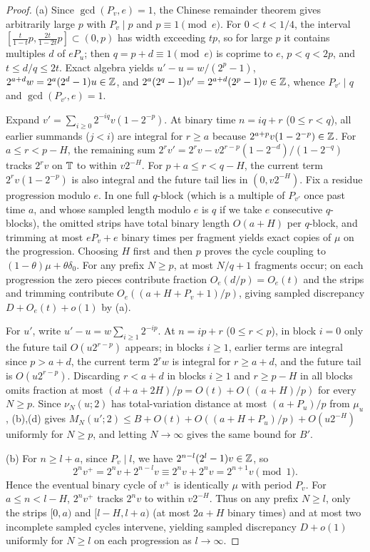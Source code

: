 \documentclass[11pt]{article}
\begin{document}
\begin{proof}
(a) Since $\gcd(P_v,e)=1$, the Chinese remainder theorem gives arbitrarily large $p$ with $P_v\mid p$ and $p\equiv1\pmod e$. For $0<t<1/4$, the interval $[\frac{t}{1-t}p,\frac{2t}{1-2t}p]\subset(0,p)$ has width exceeding $tp$, so for large $p$ it contains multiples $d$ of $eP_u$; then $q=p+d\equiv1\pmod e$ is coprime to $e$, $p<q<2p$, and $t\le d/q\le 2t$. Exact algebra yields $u'-u=w/(2^p-1)$, $2^{a+d}w=2^a(2^d-1)u\in\mathbb Z$, and $2^a(2^q-1)v'=2^{a+d}(2^p-1)v\in\mathbb Z$, whence $P_{v'}\mid q$ and $\gcd(P_{v'},e)=1$.

Expand $v'=\sum_{i\ge0}2^{-iq}v(1-2^{-p})$. At binary time $n=iq+r$ ($0\le r<q$), all earlier summands ($j<i$) are integral for $r\ge a$ because $2^{a+p}v(1-2^{-p})\in\mathbb Z$. For $a\le r<p-H$, the remaining sum $2^rv'=2^rv-v2^{r-p}(1-2^{-d})/(1-2^{-q})$ tracks $2^rv$ on $\mathbb T$ to within $v2^{-H}$. For $p+a\le r<q-H$, the current term $2^rv(1-2^{-p})$ is also integral and the future tail lies in $(0,v2^{-H})$. Fix a residue progression modulo $e$. In one full $q$-block (which is a multiple of $P_{v'}$ once past time $a$, and whose sampled length modulo $e$ is $q$ if we take $e$ consecutive $q$-blocks), the omitted strips have total binary length $O(a+H)$ per $q$-block, and trimming at most $eP_v+e$ binary times per fragment yields exact copies of $\mu$ on the progression. Choosing $H$ first and then $p$ proves the cycle coupling to $(1-\theta)\mu+\theta\delta_0$. For any prefix $N\ge p$, at most $N/q+1$ fragments occur; on each progression the zero pieces contribute fraction $O_e(d/p)=O_e(t)$ and the strips and trimming contribute $O_e((a+H+P_v+1)/p)$, giving sampled discrepancy $D+O_e(t)+o(1)$ by (a).

For $u'$, write $u'-u=w\sum_{i\ge1}2^{-ip}$. At $n=ip+r$ ($0\le r<p$), in block $i=0$ only the future tail $O(u2^{r-p})$ appears; in blocks $i\ge1$, earlier terms are integral since $p>a+d$, the current term $2^rw$ is integral for $r\ge a+d$, and the future tail is $O(u2^{r-p})$. Discarding $r<a+d$ in blocks $i\ge1$ and $r\ge p-H$ in all blocks omits fraction at most $(d+a+2H)/p=O(t)+O((a+H)/p)$ for every $N\ge p$. Since $\nu_N(u;2)$ has total-variation distance at most $(a+P_u)/p$ from $\mu_u$, (b),(d) gives $M_N(u';2)\le B+O(t)+O((a+H+P_u)/p)+O(u2^{-H})$ uniformly for $N\ge p$, and letting $N\to\infty$ gives the same bound for $B'$.

(b) For $n\ge l+a$, since $P_v\mid l$, we have $2^{n-l}(2^l-1)v\in\mathbb Z$, so
\[
2^nv^+=2^nv+2^{n-l}v\equiv 2^nv+2^nv=2^{n+1}v\pmod1.
\]
Hence the eventual binary cycle of $v^+$ is identically $\mu$ with period $P_v$. For $a\le n<l-H$, $2^nv^+$ tracks $2^nv$ to within $v2^{-H}$. Thus on any prefix $N\ge l$, only the strips $[0,a)$ and $[l-H,l+a)$ (at most $2a+H$ binary times) and at most two incomplete sampled cycles intervene, yielding sampled discrepancy $D+o(1)$ uniformly for $N\ge l$ on each progression as $l\to\infty$.


\end{proof}
\end{document}
